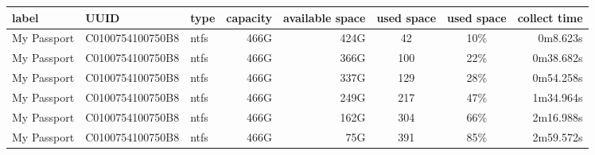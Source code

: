 \documentclass[12pt]{article}
\begin{document}
\begin{center}
  \tiny
    \begin{tabular}{|l|l|l|r|r|c|c|r|}
    \hline
    \textbf{label} & \textbf{UUID}    & \textbf{type} & \multicolumn{1}{l|}{\textbf{capacity}} & \multicolumn{1}{l|}{\textbf{available space}} & \multicolumn{1}{l|}{\textbf{used space}} & \multicolumn{1}{l|}{\textbf{used space}} & \multicolumn{1}{l|}{\textbf{collect time}} \\ \hline
    My Passport    & C0100754100750B8 & ntfs          & 466G                                   & 424G                                          & 42                                       & 10\%                                     & 0m8.623s                                   \\ \hline
    My Passport    & C0100754100750B8 & ntfs          & 466G                                   & 366G                                          & 100                                      & 22\%                                     & 0m38.682s                                  \\ \hline
    My Passport    & C0100754100750B8 & ntfs          & 466G                                   & 337G                                          & 129                                      & 28\%                                     & 0m54.258s                                  \\ \hline
    My Passport    & C0100754100750B8 & ntfs          & 466G                                   & 249G                                          & 217                                      & 47\%                                     & 1m34.964s                                  \\ \hline
    My Passport    & C0100754100750B8 & ntfs          & 466G                                   & 162G                                          & 304                                      & 66\%                                     & 2m16.988s                                  \\ \hline
    My Passport    & C0100754100750B8 & ntfs          & 466G                                   & 75G                                           & 391                                      & 85\%                                     & 2m59.572s                                  \\ \hline
    \end{tabular}
  \label{tab:SaturationLatencyData}
\end{center}
\end{document}
